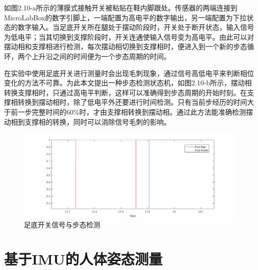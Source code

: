 如图2.10-a所示的薄膜式接触开关被粘贴在鞋内脚跟处。传感器的两端连接到MicroLabBox的数字引脚上，一端配置为高电平的数字输出，另一端配置为下拉状态的数字输入。当足底开关所在腿处于摆动阶段时，开关处于断开状态，输入信号为低电平；当其切换到支撑阶段时，开关连通使输入信号变为高电平。由此可以对摆动相和支撑相进行检测，每次摆动相切换到支撑相时，便进入到一个新的步态循环，两个上升沿之间的时间便为一个步态周期的时间。

在实验中使用足底开关进行测量时会出现毛刺现象，通过信号高低电平来判断相位变化的方法不可靠。为此本文提出一种步态检测状态机，如图2.10-b所示，摆动相转换支撑相时，只通过高电平判断，这样可以准确得到步态周期的开始时刻。在支撑相转换到摆动相时，除了低电平外还要进行时间检测。只有当前步经历的时间大于前一步完整时间的60\%时，才由支撑相转换到摆动相。通过此方法能准确检测摆动相到支撑相的转换，同时可以消除信号毛刺的影响。
\begin{figure}[htb]
    \includegraphics[width=16cm]{fig/f33.png}
    \caption{足底开关信号与步态检测}
    \label{fig:mark}
\end{figure}

\section{基于IMU的人体姿态测量}
